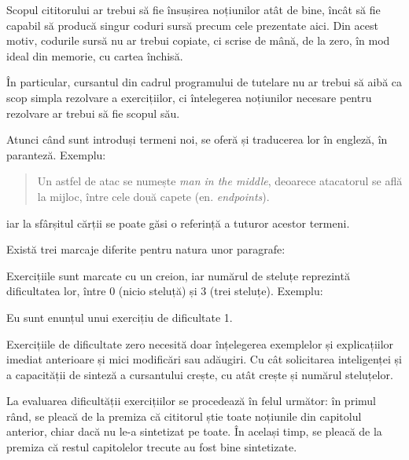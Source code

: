 Scopul cititorului ar trebui să fie însușirea noțiunilor atât de bine, încât
să fie capabil să producă singur coduri sursă precum cele prezentate aici. Din
acest motiv, codurile sursă nu ar trebui copiate, ci scrise de mână, de la zero,
în mod ideal din memorie, cu cartea închisă.

În particular, cursantul din cadrul programului de tutelare {\phpro} nu ar
trebui să aibă ca scop simpla rezolvare a exercițiilor, ci întelegerea
noțiunilor necesare pentru rezolvare ar trebui să fie scopul său.

Atunci când sunt introduși termeni noi, se oferă și traducerea lor în engleză,
în paranteză.  Exemplu: \begin{quote} Un astfel de atac se numește \textsl{man
in the middle}, deoarece atacatorul se află la mijloc, între cele două
capete (en.  \textsl{endpoints}).  \end{quote} iar la sfârșitul cărții se poate
găsi o referință a tuturor acestor termeni.

Există trei marcaje diferite pentru natura unor paragrafe:




Exercițiile sunt marcate cu un creion, iar numărul de steluțe reprezintă
dificultatea lor, între 0 (nicio steluță) și 3 (trei steluțe). Exemplu:

\begin{Exercise*}[title={Exercițiu de dificultate 1},difficulty=1]

Eu sunt enunțul unui exercițiu de dificultate 1.

\end{Exercise*}

Exercițiile de dificultate zero necesită doar înțelegerea exemplelor și
explicațiilor imediat anterioare și mici modificări sau adăugiri.  Cu cât
solicitarea inteligenței și a capacității de sinteză a cursantului crește, cu
atât crește și numărul steluțelor.

La evaluarea dificultății exercițiilor se procedează în felul următor: în primul
rând, se pleacă de la premiza că cititorul știe toate noțiunile din capitolul
anterior, chiar dacă nu le-a sintetizat pe toate. În același timp, se pleacă de
la premiza că restul capitolelor trecute au fost bine sintetizate.

